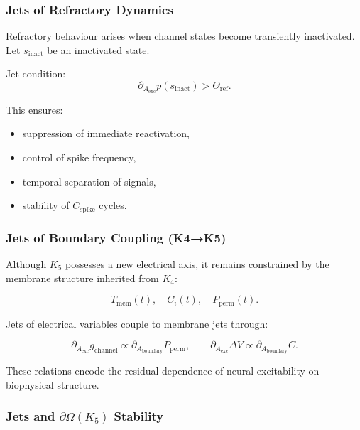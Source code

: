 \subsubsection{Jets of Refractory Dynamics}

Refractory behaviour arises when channel states become transiently
inactivated. Let $s_{\mathrm{inact}}$ be an inactivated state.

Jet condition:
\[
\partial_{A_{\mathrm{exc}}}p(s_{\mathrm{inact}}) > \Theta_{\mathrm{ref}}.
\]

This ensures:

\begin{itemize}
    \item suppression of immediate reactivation,
    \item control of spike frequency,
    \item temporal separation of signals,
    \item stability of $C_{\mathrm{spike}}$ cycles.
\end{itemize}


\subsubsection{Jets of Boundary Coupling (K4→K5)}

Although $K_5$ possesses a new electrical axis, it remains constrained by
the membrane structure inherited from $K_4$:

\[
T_{\mathrm{mem}}(t),\quad C_i(t),\quad P_{\mathrm{perm}}(t).
\]

Jets of electrical variables couple to membrane jets through:

\[
\partial_{A_{\mathrm{exc}}}g_{\mathrm{channel}}
\propto
\partial_{A_{\mathrm{boundary}}}P_{\mathrm{perm}},
\qquad
\partial_{A_{\mathrm{exc}}}\Delta V
\propto
\partial_{A_{\mathrm{boundary}}}C.
\]

These relations encode the residual dependence of neural excitability on
biophysical structure.


\subsubsection{Jets and \texorpdfstring{$\partial\Omega(K_5)$}{\partial\Omega(K_5)} Stability}

